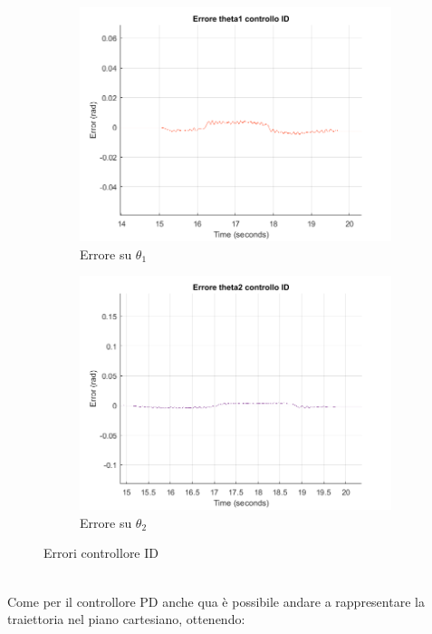 \begin{figure}
\begin{subfigure}{.53\textwidth}
  \centering
  \includegraphics[width=.9\linewidth]{Immagini/Traiettorie/ErroreTheta1ID}  
  \caption{Errore su $\theta_1$}
  \label{fig:sub-pd3k}
\end{subfigure}
\begin{subfigure}{.5\textwidth}
  \centering
  \includegraphics[width=.9\linewidth]{Immagini/Traiettorie/ErroreTheta2ID}  
  \caption{Errore su $\theta_2$}
  \label{fig:sub-pd4}
\end{subfigure}
\caption{Errori controllore ID}
\label{fig:AndamentiID}
\end{figure}
\\Come per il controllore PD anche qua è possibile andare a rappresentare la traiettoria nel piano cartesiano, ottenendo:
